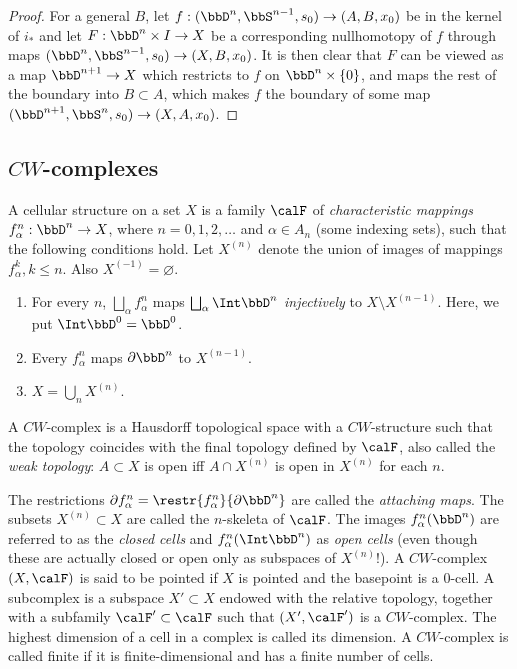 \begin{proof}
    For a general $B$, let $f:(\bbD^{n},\bbS^{n-1},s_0)\to (A,B,x_0)$ be in the kernel of $i_\ast$ and let $F:\bbD^n\times I\to X$ be a corresponding nullhomotopy of $f$ through maps $(\bbD^n,\bbS^{n-1},s_0)\to (X,B,x_0)$. It is then clear that $F$ can be viewed as a map $\bbD^{n+1}\to X$ which restricts to $f$ on $\bbD^n\times \{0\}$, and maps the rest of the boundary into $B\subset A$, which makes $f$ the boundary of some map $(\bbD^{n+1},\bbS^n,s_0)\to (X,A,x_0)$.
\end{proof}



\subsection{\texorpdfstring{$CW$}{CW}-complexes}

\begin{defn}[$CW$-complex]
    A cellular structure on a set $X$ is a family $\calF $ of \textit{characteristic mappings} $f_\alpha^n:\bbD^n\to X$, where $n=0,1,2,\ldots$ and $\alpha\in A_n$ (some indexing sets), such that the following conditions hold. Let $X^{(n)}$ denote the union of images of mappings $f_\alpha^k, k\leq n$. Also $X^{(-1)}=\varnothing$.
    \begin{enumerate}
        \item For every $n$, $\bigsqcup_\alpha f_\alpha^n$ maps $\bigsqcup_\alpha \Int \bbD^n$ \emph{injectively} to $X\setminus X^{(n-1)}$. Here, we put $\Int \bbD^0=\bbD^0$.
        \item Every $f_\alpha^n$ maps $\partial \bbD^n$ to $X^{(n-1)}$.
        \item $X=\bigcup_n X^{(n)}$.
    \end{enumerate}
    
    A $CW$-complex is a Hausdorff topological space with a $CW$-structure such that the topology coincides with the final topology defined by $\calF $, also called the \emph{weak topology}: $A\subset X$ is open iff $A\cap X^{(n)}$ is open in $X^{(n)}$ for each $n$.

    The restrictions $\partial f_\alpha^n=\restr{f_\alpha^n}{\partial \bbD^n}$ are called the \textit{attaching maps}. The subsets $X^{(n)}\subset X$ are called the $n$-skeleta of $\calF $. The images $f_\alpha^n(\bbD^n)$ are referred to as the \textit{closed cells} and $f_\alpha^n(\Int  \bbD^n)$ as \textit{open cells} (even though these are actually closed or open only as subspaces of $X^{(n)}$!). A $CW$-complex $(X,\calF )$ is said to be pointed if $X$ is pointed and the basepoint is a $0$-cell. A subcomplex is a subspace $X'\subset X$ endowed with the relative topology, together with a subfamily $\calF '\subset\calF $ such that $(X',\calF ')$ is a $CW$-complex. The highest dimension of a cell in a complex is called its dimension. A $CW$-complex is called finite if it is finite-dimensional and has a finite number of cells.
\end{defn}

